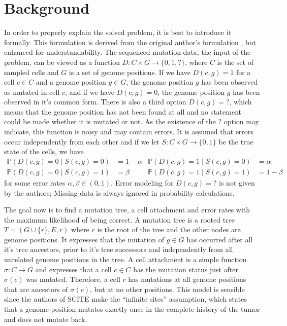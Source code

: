 \section{Background}

In order to properly explain the solved problem, it is best to introduce it formally. This formulation is derived from the original author's formulation \cite{tree2016}, but enhanced for understandability. The sequenced mutation data, the input of the problem, can be viewed as a function $D: C \times G \rightarrow \{0, 1, ?\}$, where $C$ is the set of sampled cells and $G$ is a set of genome positions. If we have $D(c, g) = 1$ for a cell $c \in C$ and a genome position $g \in G$, the genome position $g$ has been observed as mutated in cell $c$, and if we have $D(c, g) = 0$, the genome position $g$ has been observed in it's common form. There is also a third option $D(c, g) = ?$, which means that the genome position has not been found at all and no statement could be made whether it is mutated or not. As the existence of the $?$ option may indicate, this function is noisy and may contain errors. It is assumed that errors occur independently from each other and if we let $S: C \times G \rightarrow \{0, 1\}$ be the true state of the cells, we have
\begin{align*}
    \mathbb{P}(D(c, g) = 0 \mid S(c, g) = 0) &= 1 - \alpha & \mathbb{P}(D(c, g) = 1 \mid S(c, g) = 0) &= \alpha \\
    \mathbb{P}(D(c, g) = 0 \mid S(c, g) = 1) &= \beta & \mathbb{P}(D(c, g) = 1 \mid S(c, g) = 1) &= 1 - \beta
\end{align*}
for some error rates $\alpha, \beta \in (0, 1)$. Error modeling for $D(c, g) = ?$ is not given by the authors; Missing data is always ignored in probability calculations.

The goal now is to find a mutation tree, a cell attachment and error rates with the maximum likelihood of being correct. A mutation tree is a rooted tree $T = (G \cup \{r\}, E, r)$ where $r$ is the root of the tree and the other nodes are genome positions. It expresses that the mutation of $g \in G$ has occurred after all it's tree ancestors, prior to it's tree successors and independently from all unrelated genome positions in the tree. A cell attachment is a simple function $\sigma: C \rightarrow G$ and expresses that a cell $c \in C$ has the mutation status just after $\sigma(c)$ was mutated. Therefore, a cell $c$ has mutations at all genome positions that are ancestors of $\sigma(c)$, but at no other positions. This model is sensible since the authors of \ac{SCITE} make the ``infinite sites'' assumption, which states that a genome position mutates exactly once in the complete history of the tumor and does not mutate back.

